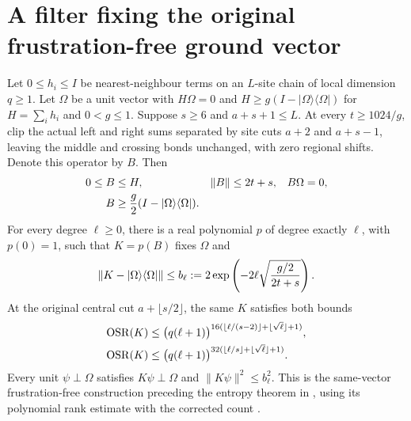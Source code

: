 \section{A filter fixing the original frustration-free ground vector}

\begin{lemma}
    \label{lem:aklv_frustration_free_filter}
    \leanok
    Let $0\le h_i\le I$ be nearest-neighbour terms on an $L$-site chain
    of local dimension $q\ge1$. Let $\Omega$ be a unit vector with
    $H\Omega=0$ and $H\ge g(I-|\Omega\rangle\langle\Omega|)$ for
    $H=\sum_i h_i$ and $0<g\le1$.
    Suppose $s\ge6$ and $a+s+1\le L$.
    At every $t\ge1024/g$, clip the actual left and right sums separated
    by site cuts $a+2$ and $a+s-1$, leaving the middle and crossing bonds
    unchanged, with zero regional shifts. Denote this operator by $B$.
    Then
    \begin{align}
        0\le B & \le H,                                             & \|B\| & \le2t+s, & B\Omega & =0,\notag \\
        B      & \ge\frac g2(I-|\Omega\rangle\langle\Omega|).\notag
    \end{align}
    For every degree $\ell\ge0$, there is a real polynomial $p$ of degree
    exactly $\ell$, with $p(0)=1$, such that $K=p(B)$ fixes $\Omega$ and
    \begin{equation}
        \|K-|\Omega\rangle\langle\Omega|\|
        \le b_\ell:=2\exp\left(-2\ell\sqrt{\frac{g/2}{2t+s}}\right).\notag
    \end{equation}
    At the original central cut $a+\lfloor s/2\rfloor$, the same $K$
    satisfies both bounds
    \begin{align}
        \operatorname{OSR}(K)
         & \le\bigl(q(\ell+1)\bigr)^{{16(\lfloor\ell/(s-2)\rfloor+\lfloor\sqrt\ell\rfloor+1)}},\notag \\
        \operatorname{OSR}(K)
         & \le\bigl(q(\ell+1)\bigr)^{{32(\lfloor\ell/s\rfloor+\lfloor\sqrt\ell\rfloor+1)}}.\notag
    \end{align}
    Every unit $\psi\perp\Omega$ satisfies $K\psi\perp\Omega$ and
    $\|K\psi\|^2\le b_\ell^2$.
    This is the same-vector frustration-free construction preceding
    the entropy theorem in \cite[Section~4]{Arad2013AreaLaw}, using its
    polynomial rank estimate with the corrected count
    \cite{gap:aklv13_interpolation_and_word_count}.
\end{lemma}
